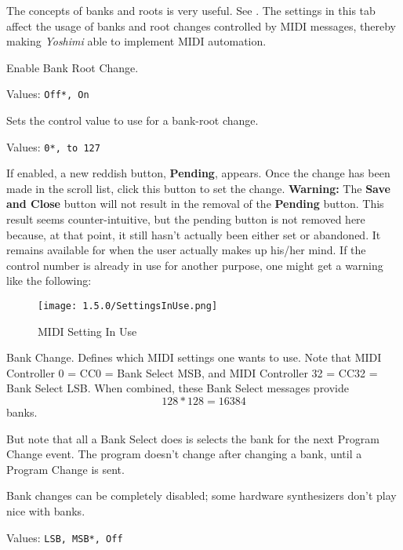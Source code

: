    \setcounter{ItemCounter}{0}      %

   The concepts of banks and roots is very useful.
   See .
   The settings in this tab affect the usage of banks and root changes
   controlled by MIDI messages, thereby making \textsl{Yoshimi} able to
   implement MIDI automation.

   Enable Bank Root Change.

   Values: \texttt{Off*, On}

   Sets the control value to use for a bank-root change.

   Values: \texttt{0*, to 127}

   If enabled, a new reddish button, \textbf{Pending}, appears.
   Once the change has been made in the scroll list, click this button
   to set the change.
   \textbf{Warning:}
   The \textbf{Save and Close} button will not result in the removal of the
   \textbf{Pending} button.
   This result seems counter-intuitive, but the pending button is not removed
   here because, at that point, it still hasn't actually been either set or
   abandoned. It remains available for when the user actually makes up his/her
   mind.
   If the control number is already in use for
   another purpose, one might get a warning like the following:

\begin{figure}[H]
   \centering 
   \texttt{[image: 1.5.0/SettingsInUse.png]}
   \caption[MIDI Setting In Use]{MIDI Setting In Use}
   \label{fig:yoshimi_settings_in_use}
\end{figure}

   Bank Change.
   Defines which MIDI settings one wants to use.
   Note that MIDI Controller 0 = CC0 = Bank Select MSB, and MIDI Controller
   32 = CC32 = Bank Select LSB.
   When combined, these Bank Select messages provide \[128*128 = 16384\]
   banks.

   But note that all a Bank Select does is selects the bank for the next
   Program Change event.  The program doesn't change after changing a bank,
   until a Program Change is sent.

   Bank changes can be completely disabled; some hardware
   synthesizers don't play nice with banks.

   Values: \texttt{LSB, MSB*, Off}

